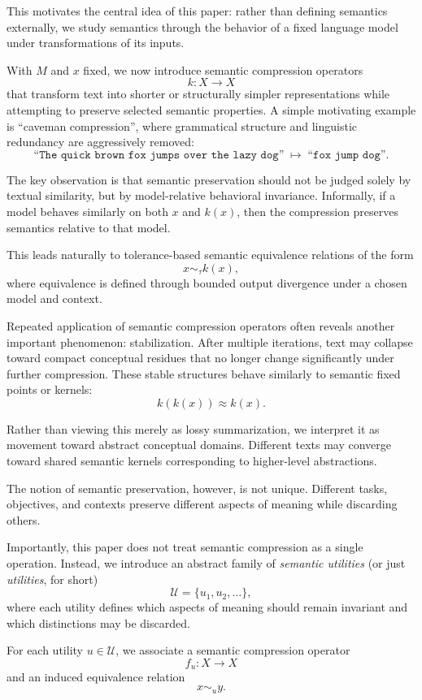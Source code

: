 This motivates the central idea of this paper:
rather than defining semantics externally, we study semantics through the behavior of a fixed language model under transformations of its inputs.

With \(M\) and \(x\) fixed, we now introduce semantic compression operators
\[
k : X \to X
\]
that transform text into shorter or structurally simpler representations while attempting to preserve selected semantic properties. A simple motivating example is ``caveman compression'', where grammatical structure and linguistic redundancy are aggressively removed:
\[
\texttt{``The quick brown fox jumps over the lazy dog''}
\;\mapsto\;
\texttt{``fox jump dog''}.
\]

The key observation is that semantic preservation should not be judged solely by textual similarity, but by model-relative behavioral invariance. Informally, if a model behaves similarly on both \(x\) and \(k(x)\), then the compression preserves semantics relative to that model.

This leads naturally to tolerance-based semantic equivalence relations of the form
\[
x \sim_\tau k(x),
\]
where equivalence is defined through bounded output divergence under a chosen model and context.

Repeated application of semantic compression operators often reveals another important phenomenon: stabilization. After multiple iterations, text may collapse toward compact conceptual residues that no longer change significantly under further compression. These stable structures behave similarly to semantic fixed points or kernels:
\[
k(k(x)) \approx k(x).
\]

Rather than viewing this merely as lossy summarization, we interpret it as movement toward abstract conceptual domains. Different texts may converge toward shared semantic kernels corresponding to higher-level abstractions.

The notion of semantic preservation, however, is not unique. Different tasks, objectives, and contexts preserve different aspects of meaning while discarding others.

Importantly, this paper does not treat semantic compression as a single operation. Instead, we introduce an abstract family of \textit{semantic utilities} (or just \textit{utilities}, for short)
\[
\mathcal{U} = \{u_1,u_2,\dots\},
\]
where each utility defines which aspects of meaning should remain invariant and which distinctions may be discarded.

For each utility \(u \in \mathcal{U}\), we associate a semantic compression operator
\[
f_u : X \to X
\]
and an induced equivalence relation
\[
x \sim_u y.
\]

